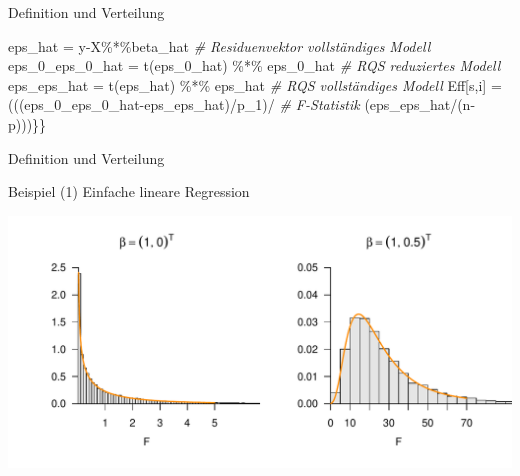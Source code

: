 \documentclass[
  8pt,
  ignorenonframetext,
]{beamer}
\newenvironment{Shaded}{\begin{snugshade}}{\end{snugshade}}
\newcommand{\CommentTok}[1]{\textcolor[rgb]{0.56,0.35,0.01}{\textit{#1}}}
\newcommand{\FunctionTok}[1]{\textcolor[rgb]{0.00,0.00,0.00}{#1}}
\newcommand{\NormalTok}[1]{#1}
\newcommand{\OtherTok}[1]{\textcolor[rgb]{0.56,0.35,0.01}{#1}}
\newcommand{\SpecialCharTok}[1]{\textcolor[rgb]{0.00,0.00,0.00}{#1}}
\begin{document}
\begin{frame}[fragile]{Definition und Verteilung}
\begin{Shaded}
\begin{Highlighting}[]
\NormalTok{    eps\_hat         }\OtherTok{=}\NormalTok{ y}\SpecialCharTok{{-}}\NormalTok{X}\SpecialCharTok{\%*\%}\NormalTok{beta\_hat                        }\CommentTok{\# Residuenvektor vollständiges Modell}
\NormalTok{    eps\_0\_eps\_0\_hat }\OtherTok{=} \FunctionTok{t}\NormalTok{(eps\_0\_hat) }\SpecialCharTok{\%*\%}\NormalTok{ eps\_0\_hat            }\CommentTok{\# RQS reduziertes Modell}
\NormalTok{    eps\_eps\_hat     }\OtherTok{=} \FunctionTok{t}\NormalTok{(eps\_hat)   }\SpecialCharTok{\%*\%}\NormalTok{ eps\_hat              }\CommentTok{\# RQS vollständiges Modell}
\NormalTok{    Eff[s,i]        }\OtherTok{=}\NormalTok{ (((eps\_0\_eps\_0\_hat}\SpecialCharTok{{-}}\NormalTok{eps\_eps\_hat)}\SpecialCharTok{/}\NormalTok{p\_1)}\SpecialCharTok{/} \CommentTok{\# F{-}Statistik}
\NormalTok{                         (eps\_eps\_hat}\SpecialCharTok{/}\NormalTok{(n}\SpecialCharTok{{-}}\NormalTok{p)))\}\}}
\end{Highlighting}
\end{Shaded}
\end{frame}

\begin{frame}{Definition und Verteilung}
\protect\hypertarget{definition-und-verteilung-7}{}
\vspace{1mm}

Beispiel (1) Einfache lineare Regression \vspace{2mm}

\vfill

\begin{center}\includegraphics[width=1\linewidth]{8_Abbildungen/alm_8_F_Statistik} \end{center}
\vfill
\end{frame}
\end{document}
